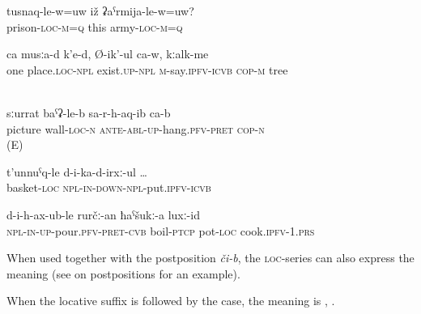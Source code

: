 %
\begin{exe}
	\ex	\label{ex:Is he in prison or in the army}
	\gll	tusnaq-le-w=uw	iž	ʡaˁrmija-le-w=uw? \\
		prison-\textsc{loc}-\textsc{m}=\textsc{q}	this		army-\textsc{loc}-\textsc{m}=\textsc{q}\\
	\glt	{}

	\ex	\label{ex:In once place, there are}
	\gll	ca	musːa-d	k'e-d,	Ø-ik'-ul ca-w,	kːalk-me\\
		one	place.\textsc{loc}-\textsc{npl}	exist.\textsc{up-npl}	\textsc{m}-say.\textsc{ipfv}-\textsc{icvb} \textsc{cop-m}	tree\\
	\glt	‎‎

	\ex	\label{ex:pic on wall_1}
	\gll	sːurrat baˁʡ-le-b sa-r-h-aq-ib ca-b\\
picture	wall-\textsc{loc-n}	\textsc{ante-abl-up}-hang.\textsc{pfv-pret}	\textsc{cop-n} \\
	\glt	{} (E)
	
	\ex	\label{ex:putting (the pears) into a basket}
	\gll	t'unnuˁq-le	d-i-ka-d-irxː-ul	\ldots\\
		basket-\textsc{loc} \textsc{npl-in-down}-\textsc{npl}-put.\textsc{ipfv}-\textsc{icvb}\\
	\glt	{}

	\ex	\label{ex:We pour (the xinkal) into a pot with boiling (water) and cook it}
	\gll	d-i-h-ax-ub-le	rurčː-an	ħaˁšukː-a	luxː-id\\
		\textsc{npl-in-up}-pour.\textsc{pfv}-\textsc{pret}-\textsc{cvb}	boil-\textsc{ptcp}	pot-\textsc{loc}		cook.\textsc{ipfv}-1.\textsc{prs}\\
	\glt	{}
\end{exe}

When used together with the postposition \textit{či-b}, the \textsc{loc}-series can also express the meaning  (see  on postpositions for an example).

When the locative suffix is followed by the  case, the meaning is  , . 


